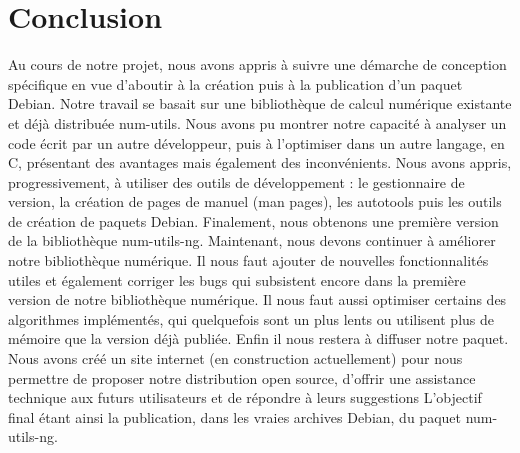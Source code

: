 \chapter{Conclusion}

Au cours de notre projet, nous avons appris \`a suivre une d\'emarche de conception sp\'ecifique en vue d'aboutir \`a la cr\'eation
puis \`a la publication d'un paquet Debian. Notre travail se basait sur une biblioth\`eque de calcul num\'erique existante et d\'ej\`a
distribu\'ee num-utils. Nous avons pu montrer notre capacit\'e \`a analyser un code \'ecrit par un autre d\'eveloppeur, puis \`a l'optimiser dans 
un autre langage, en C, pr\'esentant des avantages mais \'egalement des inconv\'enients. Nous avons appris, progressivement, \`a utiliser des outils
de d\'eveloppement : le gestionnaire de version, la cr\'eation de pages de manuel (man pages), les autotools puis les outils de cr\'eation de paquets Debian. Finalement, nous obtenons une premi\`ere
version de la biblioth\`eque num-utils-ng.
\newline
\newline
Maintenant, nous devons continuer \`a am\'eliorer notre biblioth\`eque num\'erique. Il nous faut ajouter de nouvelles fonctionnalit\'es utiles et \'egalement 
corriger les bugs qui subsistent encore dans la premi\`ere version de notre biblioth\`eque num\'erique. Il nous faut aussi optimiser certains des 
algorithmes impl\'ement\'es, qui quelquefois sont un plus lents ou utilisent plus de m\'emoire que la version d\'ej\`a publi\'ee. Enfin il nous restera \`a
diffuser notre paquet. Nous avons cr\'e\'e un site internet (en construction actuellement) pour nous permettre de proposer notre distribution open source,
d'offrir une assistance technique aux futurs utilisateurs et de r\'epondre \`a leurs suggestions
\newline
\newline
L'objectif final \'etant ainsi la publication, dans les vraies archives Debian, du paquet num-utils-ng.
